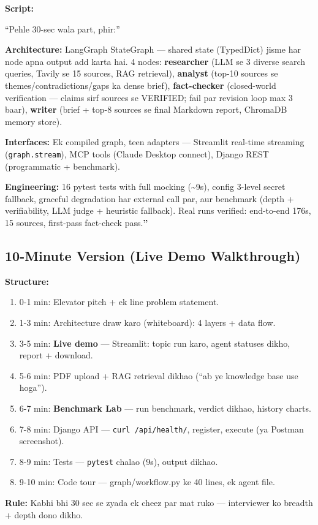 \begin{interviewbox}
\textbf{Script:}

``Pehle 30-sec wala part, phir:''

\textbf{Architecture:} LangGraph StateGraph --- shared state (TypedDict) jisme har node apna output add karta hai. 4 nodes: \textbf{researcher} (LLM se 3 diverse search queries, Tavily se 15 sources, RAG retrieval), \textbf{analyst} (top-10 sources se themes/contradictions/gaps ka dense brief), \textbf{fact-checker} (closed-world verification --- claims sirf sources se VERIFIED; fail par revision loop max 3 baar), \textbf{writer} (brief + top-8 sources se final Markdown report, ChromaDB memory store).

\textbf{Interfaces:} Ek compiled graph, teen adapters --- Streamlit real-time streaming (\texttt{graph.stream}), MCP tools (Claude Desktop connect), Django REST (programmatic + benchmark).

\textbf{Engineering:} 16 pytest tests with full mocking (\textasciitilde9s), config 3-level secret fallback, graceful degradation har external call par, aur benchmark (depth + verifiability, LLM judge + heuristic fallback). Real runs verified: end-to-end 176s, 15 sources, first-pass fact-check pass.\textbf{''}
\end{interviewbox}

\subsection{10-Minute Version (Live Demo Walkthrough)}

\begin{interviewbox}
\textbf{Structure:}
\begin{enumerate}[label=\arabic*.]
\item 0-1 min: Elevator pitch + ek line problem statement.
\item 1-3 min: Architecture draw karo (whiteboard): 4 layers + data flow.
\item 3-5 min: \textbf{Live demo} --- Streamlit: topic run karo, agent statuses dikho, report + download.
\item 5-6 min: PDF upload + RAG retrieval dikhao (``ab ye knowledge base use hoga'').
\item 6-7 min: \textbf{Benchmark Lab} --- run benchmark, verdict dikhao, history charts.
\item 7-8 min: Django API --- \texttt{curl /api/health/}, register, execute (ya Postman screenshot).
\item 8-9 min: Tests --- \texttt{pytest} chalao (9s), output dikhao.
\item 9-10 min: Code tour --- graph/workflow.py ke 40 lines, ek agent file.
\end{enumerate}

\textbf{Rule:} Kabhi bhi 30 sec se zyada ek cheez par mat ruko --- interviewer ko breadth + depth dono dikho.
\end{interviewbox}

